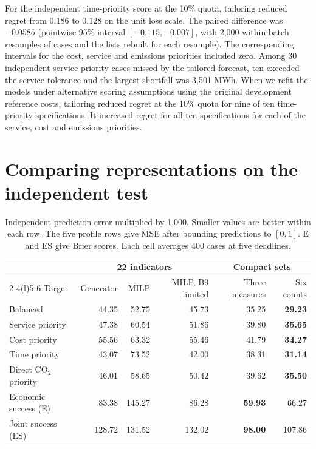 \documentclass[11pt,a4paper]{article}
\newcommand{\CO}{CO$_2$}
\newcommand{\tablefont}{\small\renewcommand{\arraystretch}{1.14}}
\begin{document}
For the independent time-priority score at the 10\% quota, tailoring reduced regret from 0.186 to 0.128 on the unit loss scale. The paired difference was $-0.0585$ (pointwise 95\% interval $[-0.115,-0.007]$, with 2,000 within-batch resamples of cases and the lists rebuilt for each resample). The corresponding intervals for the cost, service and emissions priorities included zero. Among 30 independent service-priority cases missed by the tailored forecast, ten exceeded the service tolerance and the largest shortfall was 3,501 MWh. When we refit the models under alternative scoring assumptions using the original development reference costs, tailoring reduced regret at the 10\% quota for nine of ten time-priority specifications. It increased regret for all ten specifications for each of the service, cost and emissions priorities.

\section{Comparing representations on the independent test}
\label{app:external}

\begin{table}[htbp]\centering\tablefont
\caption{Independent prediction error multiplied by 1,000. Smaller values are better within each row. The five profile rows give MSE after bounding predictions to $[0,1]$. E and ES give Brier scores. Each cell averages 400 cases at five deadlines.}
\label{tab:final_independent_descriptors}
\begin{tabular}{@{}lrrrrr@{}}\toprule
& \multicolumn{3}{c}{22 indicators} & \multicolumn{2}{c}{Compact sets}\\
\cmidrule(lr){2-4}\cmidrule(l){5-6}
Target & Generator & MILP & MILP, B9 limited & Three measures & Six counts\\\midrule
Balanced & 44.35 & 52.75 & 45.73 & 35.25 & \textbf{29.23}\\
Service priority & 47.38 & 60.54 & 51.86 & 39.80 & \textbf{35.65}\\
Cost priority & 55.56 & 63.32 & 55.46 & 41.79 & \textbf{34.27}\\
Time priority & 43.07 & 73.52 & 42.00 & 38.31 & \textbf{31.14}\\
Direct \CO{} priority & 46.01 & 58.65 & 50.42 & 39.62 & \textbf{35.50}\\
\addlinespace
Economic success (E) & 83.38 & 145.27 & 86.28 & \textbf{59.93} & 66.27\\
Joint success (ES) & 128.72 & 131.52 & 132.02 & \textbf{98.00} & 107.86\\
\bottomrule\end{tabular}
\end{table}
\end{document}

